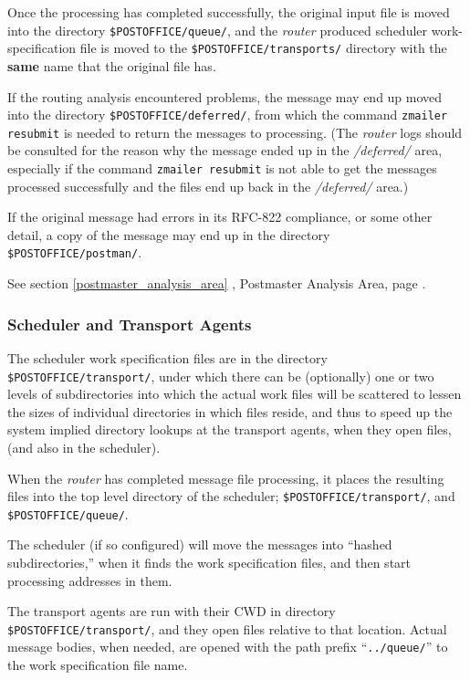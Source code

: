 Once the processing has completed successfully, the original
input file is moved into the directory {\tt \$POSTOFFICE/queue/}, and
the {\em router\/} produced scheduler work-specification file is moved
to the {\tt \$POSTOFFICE/transports/} directory with the {\bf same}
name that the original file has.

If the routing analysis encountered problems, the message
may end up moved into the directory {\tt \$POSTOFFICE/deferred/}, from
which the command {\tt zmailer resubmit} is needed to return 
the messages to processing. (The {\em router\/} logs should be consulted 
for the reason why the message ended up in the {\em /deferred/\/} area,
especially if the command {\tt zmailer resubmit} is not able
to get the messages processed successfully and
the files end up back in the {\em /deferred/\/} area.)

If the original message had errors in its RFC-822 compliance,
or some other detail, a copy of the message may end up in the 
directory {\tt \$POSTOFFICE/postman/}.  

See 
section
\ref{postmaster_analysis_area}
, Postmaster Analysis Area, page 
\pageref{postmaster_analysis_area}.




\subsubsection{Scheduler and Transport Agents}



The scheduler work specification files are in the directory
{\tt \$POSTOFFICE/transport/}, under which there can be (optionally)
one or two levels of subdirectories into which the actual
work files will be scattered to lessen the sizes of individual
directories in which files reside, and thus to speed up the
system implied directory lookups at the transport agents, when
they open files, (and also in the scheduler).

When the {\em router\/} has completed message file processing, it places the
resulting files into the top level directory of the scheduler; 
{\tt \$POSTOFFICE/transport/}, and {\tt \$POSTOFFICE/queue/}.

The scheduler (if so configured) will move the messages into 
``hashed subdirectories,'' when it finds the work specification files, 
and then start processing addresses in them.

The transport agents are run with their CWD in directory 
{\tt \$POSTOFFICE/transport/}, 
and they open files relative to that location. Actual message bodies, when 
needed, are opened with the path prefix ``{\tt ../queue/}'' to the work 
specification file name.


